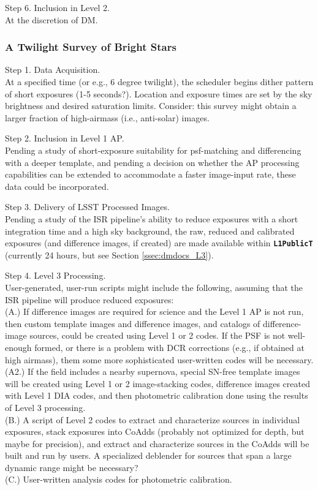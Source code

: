 \documentclass[DM,lsstdraft,toc]{lsstdoc}
\begin{document}
Step 6. Inclusion in Level 2. \\ At the discretion of DM.


\subsubsection{A Twilight Survey of Bright Stars}

Step 1. Data Acquisition. \\ At a specified time (or e.g., 6 degree twilight), the scheduler begins dither pattern of short exposures (1-5 seconds?). Location and exposure times are set by the sky brightness and desired saturation limits. Consider: this survey might obtain a larger fraction of high-airmass (i.e., anti-solar) images.

Step 2. Inclusion in Level 1 AP. \\ Pending a study of short-exposure suitability for psf-matching and differencing with a deeper template, and pending a decision on whether the AP processing capabilities can be extended to accommodate a faster image-input rate, these data could be incorporated.

Step 3. Delivery of LSST Processed Images. \\ Pending a study of the ISR pipeline's ability to reduce exposures with a short integration time and a high sky background, the raw, reduced and calibrated exposures (and difference images, if created) are made available within {\tt \textbf{L1PublicT}} (currently 24 hours, but see Section \ref{ssec:dmdocs_L3}).

Step 4. Level 3 Processing. \\ User-generated, user-run scripts might include the following, assuming that the ISR pipeline will produce reduced exposures: \\
(A.) If difference images are required for science and the Level 1 AP is not run, then custom template images and difference images, and catalogs of difference-image sources, could be created using Level 1 or 2 codes. If the PSF is not well-enough formed, or there is a problem with DCR corrections (e.g., if obtained at high airmass), them some more sophisticated user-written codes will be necessary. \\
(A2.) If the field includes a nearby supernova, special SN-free template images will be created using Level 1 or 2 image-stacking codes, difference images created with Level 1 DIA codes, and then photometric calibration done using the results of Level 3 processing.\\
(B.) A script of Level 2 codes to extract and characterize sources in individual exposures, stack exposures into CoAdds (probably not optimized for depth, but maybe for precision), and extract and characterize sources in the CoAdds will be built and run by users. A specialized deblender for sources that span a large dynamic range might be necessary? \\
(C.) User-written analysis codes for photometric calibration. 
\end{document}
